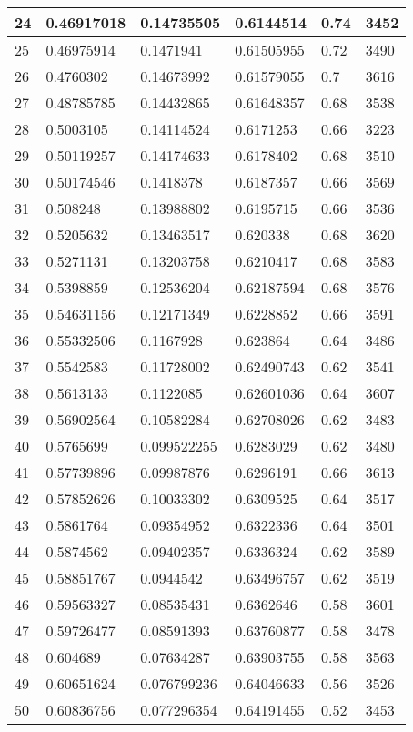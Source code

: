 \begin{longtable}{|l|l|l|l|l|l|}
24 & 0.46917018 & 0.14735505 & 0.6144514 & 0.74 & 3452 \\ \hline 
25 & 0.46975914 & 0.1471941 & 0.61505955 & 0.72 & 3490 \\ \hline 
26 & 0.4760302 & 0.14673992 & 0.61579055 & 0.7 & 3616 \\ \hline 
27 & 0.48785785 & 0.14432865 & 0.61648357 & 0.68 & 3538 \\ \hline 
28 & 0.5003105 & 0.14114524 & 0.6171253 & 0.66 & 3223 \\ \hline 
29 & 0.50119257 & 0.14174633 & 0.6178402 & 0.68 & 3510 \\ \hline 
30 & 0.50174546 & 0.1418378 & 0.6187357 & 0.66 & 3569 \\ \hline 
31 & 0.508248 & 0.13988802 & 0.6195715 & 0.66 & 3536 \\ \hline 
32 & 0.5205632 & 0.13463517 & 0.620338 & 0.68 & 3620 \\ \hline 
33 & 0.5271131 & 0.13203758 & 0.6210417 & 0.68 & 3583 \\ \hline 
34 & 0.5398859 & 0.12536204 & 0.62187594 & 0.68 & 3576 \\ \hline 
35 & 0.54631156 & 0.12171349 & 0.6228852 & 0.66 & 3591 \\ \hline 
36 & 0.55332506 & 0.1167928 & 0.623864 & 0.64 & 3486 \\ \hline 
37 & 0.5542583 & 0.11728002 & 0.62490743 & 0.62 & 3541 \\ \hline 
38 & 0.5613133 & 0.1122085 & 0.62601036 & 0.64 & 3607 \\ \hline 
39 & 0.56902564 & 0.10582284 & 0.62708026 & 0.62 & 3483 \\ \hline 
40 & 0.5765699 & 0.099522255 & 0.6283029 & 0.62 & 3480 \\ \hline 
41 & 0.57739896 & 0.09987876 & 0.6296191 & 0.66 & 3613 \\ \hline 
42 & 0.57852626 & 0.10033302 & 0.6309525 & 0.64 & 3517 \\ \hline 
43 & 0.5861764 & 0.09354952 & 0.6322336 & 0.64 & 3501 \\ \hline 
44 & 0.5874562 & 0.09402357 & 0.6336324 & 0.62 & 3589 \\ \hline 
45 & 0.58851767 & 0.0944542 & 0.63496757 & 0.62 & 3519 \\ \hline 
46 & 0.59563327 & 0.08535431 & 0.6362646 & 0.58 & 3601 \\ \hline 
47 & 0.59726477 & 0.08591393 & 0.63760877 & 0.58 & 3478 \\ \hline 
48 & 0.604689 & 0.07634287 & 0.63903755 & 0.58 & 3563 \\ \hline 
49 & 0.60651624 & 0.076799236 & 0.64046633 & 0.56 & 3526 \\ \hline 
50 & 0.60836756 & 0.077296354 & 0.64191455 & 0.52 & 3453 \\ \hline 
\end{longtable}